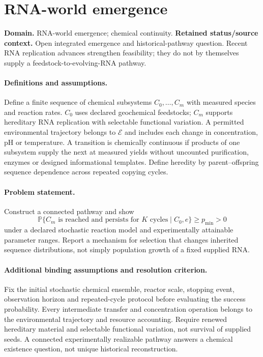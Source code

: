 \documentclass[11pt]{article}
\begin{document}
\section*{RNA-world emergence}
\label{prob:284}
\label{rank:1}
\par\smallskip

\noindent\textbf{Domain.} RNA-world emergence; chemical continuity. \quad \textbf{Retained status/source context.} Open integrated emergence and historical-pathway question. Recent RNA replication advances strengthen feasibility; they do not by themselves supply a feedstock-to-evolving-RNA pathway.

\paragraph{Definitions and assumptions.} Define a finite sequence of chemical subsystems $C_0,\ldots,C_m$ with measured species and reaction rates. $C_0$ uses declared geochemical feedstocks; $C_m$ supports hereditary RNA replication with selectable functional variation. A permitted environmental trajectory belongs to $\mathcal E$ and includes each change in concentration, pH or temperature. A transition is chemically continuous if products of one subsystem supply the next at measured yields without uncounted purification, enzymes or designed informational templates. Define heredity by parent--offspring sequence dependence across repeated copying cycles.

\paragraph{Problem statement.} Construct a connected pathway and show
\[
\mathbb{P}\{C_m\text{ is reached and persists for }K\text{ cycles}\mid C_0,e\}\geq p_{\min}>0
\]
under a declared stochastic reaction model and experimentally attainable parameter ranges. Report a mechanism for selection that changes inherited sequence distributions, not simply population growth of a fixed supplied RNA.

\paragraph{Additional binding assumptions and resolution criterion.} Fix the initial stochastic chemical ensemble, reactor scale, stopping event, observation horizon and repeated-cycle protocol before evaluating the success probability. Every intermediate transfer and concentration operation belongs to the environmental trajectory and resource accounting. Require renewed hereditary material and selectable functional variation, not survival of supplied seeds. A connected experimentally realizable pathway answers a chemical existence question, not unique historical reconstruction.
\end{document}

